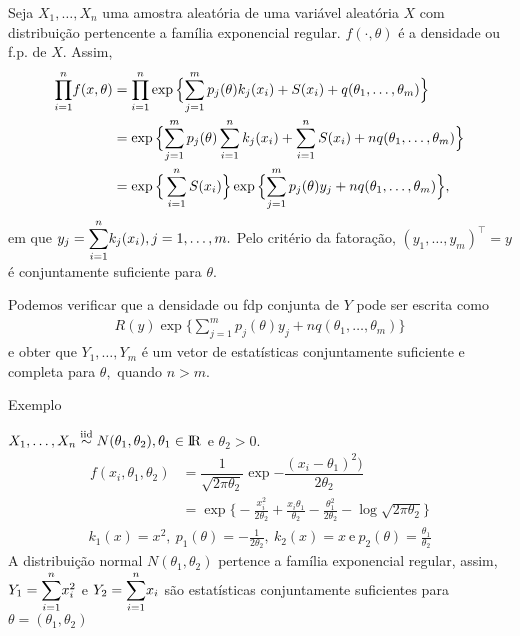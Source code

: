 \documentclass[12pt]{beamer}
\begin{document}
\begin{frame}{}
\begin{block}{}
\justifying
Seja $X_{1},\ldots,X_{n}$ uma amostra aleatória de uma variável aleatória $X$ com distribuição pertencente a família exponencial regular. $f(\cdot,\theta)$ é a densidade ou f.p. de $X.$ Assim, 
\begin{align*}
    {\displaystyle \prod_{i=1}^{n}} f(x,\theta)&={\displaystyle \prod_{i=1}^{n}} \exp{\Big\{{\displaystyle \sum_{j=1}^{m}p_{j}(\theta)k_{j}(x_{i})+S(x_{i})+q(\theta_{1},\ldots,\theta_{m})}\Big\}}\\
    &=\exp{\Big\{{\displaystyle \sum_{j=1}^{m}p_{j}(\theta)\sum_{i=1}^{n}k_{j}(x_{i}) + \sum_{i=1}^{n}S(x_{i}) + nq(\theta_{1},\ldots,\theta_{m})}\Big\}}\\
    &=\exp{\Big\{\sum_{i=1}^{n}S(x_{i})\Big\}}\exp{\Big\{{\displaystyle \sum_{j=1}^{m}p_{j}(\theta)y_{j} + nq(\theta_{1}, \ldots, \theta_{m})} \Big\}},    
\end{align*}
em que $y_{j}={\displaystyle \sum_{i=1}^{n}} k_{j}(x_{i}),j=1,\ldots,m.$ Pelo critério da fatoração, $(y_{1},\ldots,y_{m})^{\top}=y$ é conjuntamente suficiente para $\theta.$
\end{block}
\end{frame}

\begin{frame}{}
\begin{block}{}
\justifying
Podemos verificar que a densidade ou fdp conjunta de $Y$ pode ser escrita como
\begin{align*}
    R(y)\exp{\Big\{{\displaystyle \sum_{j=1}^{m}p_{j}(\theta)y_{j}+nq(\theta_{1}, \ldots, \theta_{m})}\Big\}}
\end{align*}
e obter que $Y_{1},\ldots,Y_{m}$ é um vetor de estatísticas conjuntamente suficiente e completa para $\theta,$ quando $n>m.$
\end{block}
\end{frame}

\begin{frame}{Exemplo}
\vspace{-0.2cm}
\begin{block}{}
\justifying
$X_{1},\ldots,X_{n}\overset{\text{iid}}{\sim} N(\theta_{1},\theta_{2}),\theta_{1}\in \rm I\!R$ e $\theta_{2}>0.$
\begin{align*}
    f(x_{i},\theta_{1},\theta_{2})&=\dfrac{1}{\sqrt{2\pi\theta_{2}}}\exp{-\dfrac{(x_{i}-\theta_{1})^{2})}{2\theta_{2}}}\\
    &=\exp{\Big\{-\frac{x_{i}^{2}}{2\theta_{2}}+\frac{x_{i}\theta_{1}}{\theta_{2}}-\frac{\theta_{1}^{2}}{2\theta_{2}}-\log{\sqrt{2\pi\theta_{2}}}\Big\}}
\end{align*}
\pause
\begin{align*}
k_{1}(x)=x^{2},~p_{1}(\theta)=-\frac{1}{2\theta_{2}},~k_{2}(x)=x~\text{e}~p_{2}(\theta)=\frac{\theta_{1}}{\theta_{2}}
\end{align*}
A distribuição normal $N(\theta_{1},\theta_{2})$ pertence a família exponencial regular, assim, $Y_{1}={\displaystyle \sum_{i=1}^{n}} x_{i}^{2}$ e $Y_{2}={\displaystyle \sum_{i=1}^{n}} x_{i}$ são estatísticas conjuntamente suficientes para $\theta=(\theta_{1},\theta_{2})$
\end{block}
\end{frame}
\end{document}
